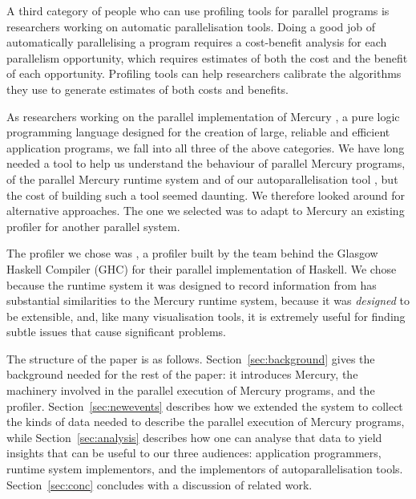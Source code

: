 A third category of people who can use profiling tools for parallel programs
is researchers working on automatic parallelisation tools.
Doing a good job of automatically parallelising a program
requires a cost-benefit analysis for each parallelism opportunity,
which requires estimates of both the cost and the benefit of each opportunity.
Profiling tools can help researchers calibrate
the algorithms they use to generate estimates of both costs and benefits.

As researchers working on the parallel implementation of Mercury \citep{mercury_jlp},
a pure logic programming language designed for
the creation of large, reliable and efficient application programs,
we fall into all three of the above categories.
We have long needed a tool
to help us understand the behaviour of parallel Mercury programs,
of the parallel Mercury runtime system
and of our autoparallelisation tool \citep{bone:2011:overlap},
but the cost of building such a tool seemed daunting.
We therefore looked around for alternative approaches.
The one we selected was to adapt to Mercury
an existing profiler for another parallel system.

The profiler we chose was \tscope \citep{threadscope},
a profiler built by the team behind the Glasgow Haskell Compiler (GHC)
for their parallel implementation of Haskell.
We chose \tscope because
the runtime system it was designed to record information from
has substantial similarities to the Mercury runtime system,
because it was \emph{designed} to be extensible,
and, like many visualisation tools, it is extremely useful
for finding subtle issues that cause significant problems.


The structure of the paper is as follows.
Section~\ref{sec:background} gives the background
needed for the rest of the paper:
it introduces Mercury,
the machinery involved in the parallel execution of Mercury programs,
and the \tscope profiler.
Section~\ref{sec:newevents}
describes how we extended the \tscope system
to collect the kinds of data needed to describe
the parallel execution of Mercury programs,
while Section~\ref{sec:analysis} describes how
one can analyse that data to yield insights
that can be useful to our three audiences:
application programmers,
runtime system implementors,
and the implementors of autoparallelisation tools.
Section~\ref{sec:conc}
concludes with a discussion of related work.

